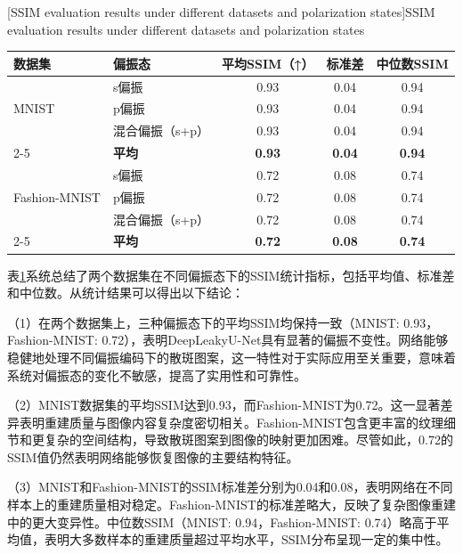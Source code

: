 {\begin{table}[!htbp]
    \centering
    [SSIM evaluation results under different datasets and polarization states]{\enspace SSIM evaluation results under different datasets and polarization states}
    \label{tab:ssim_by_dataset_polarization}
    \footnotesize
    \setlength{\tabcolsep}{8pt}
    \renewcommand{\arraystretch}{1.3}
    \begin{tabular}{llccc}
        \hline
        数据集 & 偏振态 & 平均SSIM（↑） & 标准差 & 中位数SSIM \\
        \hline
        \multirow{3}{*}{MNIST} & s偏振 & 0.93 & 0.04 & 0.94 \\
        & p偏振 & 0.93 & 0.04 & 0.94 \\
        & 混合偏振（s+p） & 0.93 & 0.04 & 0.94 \\
        \cline{2-5}
        & \textbf{平均} & \textbf{0.93} & \textbf{0.04} & \textbf{0.94} \\
        \hline
        \multirow{3}{*}{Fashion-MNIST} & s偏振 & 0.72 & 0.08 & 0.74 \\
        & p偏振 & 0.72 & 0.08 & 0.74 \\
        & 混合偏振（s+p） & 0.72 & 0.08 & 0.74 \\
        \cline{2-5}
        & \textbf{平均} & \textbf{0.72} & \textbf{0.08} & \textbf{0.74} \\
        \hline
    \end{tabular}
\end{table}

表\ref{tab:ssim_by_dataset_polarization}系统总结了两个数据集在不同偏振态下的SSIM统计指标，包括平均值、标准差和中位数。从统计结果可以得出以下结论：

（1）在两个数据集上，三种偏振态下的平均SSIM均保持一致（MNIST: 0.93，Fashion-MNIST: 0.72），表明DeepLeakyU-Net具有显著的偏振不变性。网络能够稳健地处理不同偏振编码下的散斑图案，这一特性对于实际应用至关重要，意味着系统对偏振态的变化不敏感，提高了实用性和可靠性。

（2）MNIST数据集的平均SSIM达到0.93，而Fashion-MNIST为0.72。这一显著差异表明重建质量与图像内容复杂度密切相关。Fashion-MNIST包含更丰富的纹理细节和更复杂的空间结构，导致散斑图案到图像的映射更加困难。尽管如此，0.72的SSIM值仍然表明网络能够恢复图像的主要结构特征。

（3）MNIST和Fashion-MNIST的SSIM标准差分别为0.04和0.08，表明网络在不同样本上的重建质量相对稳定。Fashion-MNIST的标准差略大，反映了复杂图像重建中的更大变异性。中位数SSIM（MNIST: 0.94，Fashion-MNIST: 0.74）略高于平均值，表明大多数样本的重建质量超过平均水平，SSIM分布呈现一定的集中性。

}
